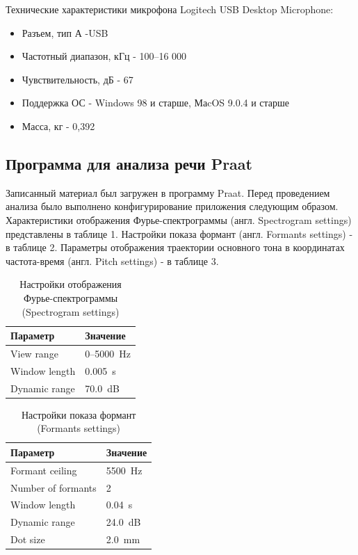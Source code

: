 Технические характеристики микрофона Logitech USB Desktop Microphone:

\begin{itemize}
    \item Разъем, тип А -USB
    \item Частотный диапазон, кГц - 100–16 000
    \item Чувствительность, дБ - 67
    \item Поддержка ОС - Windows 98 и старше, МаcOS 9.0.4 и старше
    \item Масса, кг - 0,392
\end{itemize}

\subsection*{Программа для анализа речи Praat}

Записанный материал был загружен в программу Praat. Перед проведением анализа
было выполнено конфигурирование приложения следующим образом. Характеристики
отображения Фурье-спектрограммы (англ. Spectrogram settings) представлены в
таблице 1.  Настройки показа формант (англ. Formants settings) - в таблице 2.
Параметры отображения траектории основного тона в координатах частота-время
(англ. Pitch settings) - в таблице 3.

\begin{table}[H]
\centering
\label{tab:tab01}
\caption{Настройки отображения Фурье-спектрограммы (Spectrogram settings)}
\begin{tabular}{|l|l|}
\hline
Параметр      & Значение        \\
\hline
View range    & 0--5000~Hz      \\
Window length & 0.005~s         \\
Dynamic range & 70.0~dB         \\
\hline
\end{tabular}
\end{table}

\begin{table}[H]
\centering
\label{tab:tab02}
\caption{Настройки показа формант (Formants settings)}
\begin{tabular}{|l|l|}
\hline
Параметр           & Значение      \\
\hline
Formant ceiling    & 5500~Hz       \\
Number of formants & 2             \\
Window length      & 0.04~s        \\
Dynamic range      & 24.0~dB       \\
Dot size           & 2.0~mm        \\
\hline
\end{tabular}
\end{table}

